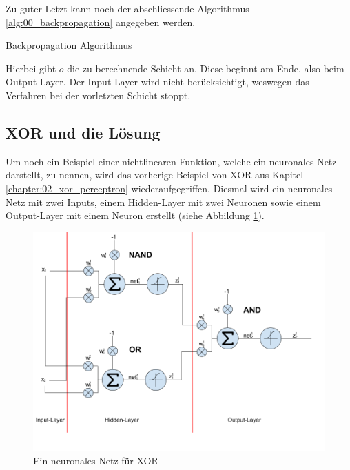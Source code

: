 \newpage
Zu guter Letzt kann noch der abschliessende Algorithmus \ref{alg:00_backpropagation} angegeben werden.\\
\begin{algorithm}[H]
    \caption{Backpropagation Algorithmus}
    \label{alg:00_backpropagation}
\end{algorithm}
Hierbei gibt $o$ die zu berechnende Schicht an. Diese beginnt am Ende, also beim Output-Layer. Der Input-Layer wird nicht
berücksichtigt, weswegen das Verfahren bei der vorletzten Schicht stoppt.

\newpage
\subsection{XOR und die Lösung}
Um noch ein Beispiel einer nichtlinearen Funktion, welche ein neuronales Netz darstellt, zu nennen, wird das vorherige
Beispiel von \glqq XOR\grqq{} aus Kapitel \ref{chapter:02_xor_perceptron} wiederaufgegriffen. Diesmal wird ein neuronales Netz mit
zwei Inputs, einem Hidden-Layer mit zwei Neuronen sowie einem Output-Layer mit einem Neuron erstellt (siehe Abbildung
\ref{fig:10_xor_neuronal_network}).
\begin{figure}[h!]
    \begin{center}
        \includegraphics[width=1\linewidth]{../common/01_neuronal_network/00_resources/06_xor_neuronal_network.png}
    \end{center}
    \caption{Ein neuronales Netz für XOR}
    \label{fig:10_xor_neuronal_network}
\end{figure}
\newpage

